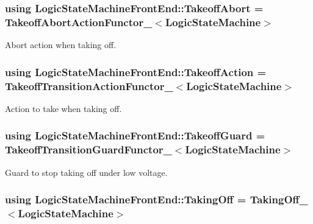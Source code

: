 \hypertarget{classLogicStateMachineFrontEnd_a26036773cac59b48b9e545acc870a29b}{
\subsubsection[{Takeoff\-Abort}]{\setlength{\rightskip}{0pt plus 5cm}using {\bf Logic\-State\-Machine\-Front\-End\-::\-Takeoff\-Abort} =  {\bf Takeoff\-Abort\-Action\-Functor\-\_\-}$<${\bf Logic\-State\-Machine}$>$}}\label{classLogicStateMachineFrontEnd_a26036773cac59b48b9e545acc870a29b}


Abort action when taking off. 

\hypertarget{classLogicStateMachineFrontEnd_af73bbbe19d413f3786c265fe91a94ffb}{
\subsubsection[{Takeoff\-Action}]{\setlength{\rightskip}{0pt plus 5cm}using {\bf Logic\-State\-Machine\-Front\-End\-::\-Takeoff\-Action} =  {\bf Takeoff\-Transition\-Action\-Functor\-\_\-}$<${\bf Logic\-State\-Machine}$>$}}\label{classLogicStateMachineFrontEnd_af73bbbe19d413f3786c265fe91a94ffb}


Action to take when taking off. 

\hypertarget{classLogicStateMachineFrontEnd_a4660e7e7dbd8bc3f7a379a076999187d}{
\subsubsection[{Takeoff\-Guard}]{\setlength{\rightskip}{0pt plus 5cm}using {\bf Logic\-State\-Machine\-Front\-End\-::\-Takeoff\-Guard} =  {\bf Takeoff\-Transition\-Guard\-Functor\-\_\-}$<${\bf Logic\-State\-Machine}$>$}}\label{classLogicStateMachineFrontEnd_a4660e7e7dbd8bc3f7a379a076999187d}


Guard to stop taking off under low voltage. 

\hypertarget{classLogicStateMachineFrontEnd_a98f3148dbabd87749be3c63ea0ec2a00}{
\subsubsection[{Taking\-Off}]{\setlength{\rightskip}{0pt plus 5cm}using {\bf Logic\-State\-Machine\-Front\-End\-::\-Taking\-Off} =  {\bf Taking\-Off\-\_\-}$<${\bf Logic\-State\-Machine}$>$}}\label{classLogicStateMachineFrontEnd_a98f3148dbabd87749be3c63ea0ec2a00}


